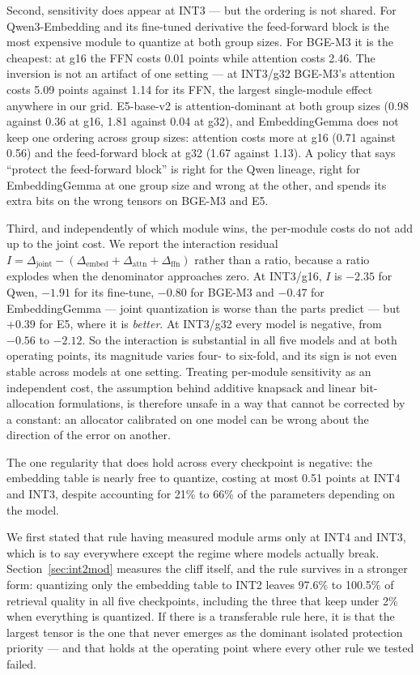 \documentclass[11pt]{article}
\begin{document}
Second, sensitivity does appear at INT3 --- but the ordering is not shared. For
Qwen3-Embedding and its fine-tuned derivative the feed-forward block is the most expensive
module to quantize at both group sizes. For BGE-M3 it is the cheapest: at g16 the FFN costs
0.01 points while attention costs 2.46. The inversion is not an artifact of one setting --- at
INT3/g32 BGE-M3's attention costs 5.09 points against 1.14 for its FFN, the largest
single-module effect anywhere in our grid. E5-base-v2 is attention-dominant at both group
sizes (0.98 against 0.36 at g16, 1.81 against 0.04 at g32), and EmbeddingGemma does not keep
one ordering across group sizes: attention costs more at g16 (0.71 against 0.56) and the
feed-forward block at g32 (1.67 against 1.13). A policy that says ``protect the feed-forward
block'' is right for the Qwen lineage, right for EmbeddingGemma at one group size and wrong at
the other, and spends its extra bits on the wrong tensors on BGE-M3 and E5.

Third, and independently of which module wins, the per-module costs do not add up to the
joint cost. We report the interaction residual $I = \Delta_{\text{joint}} -
(\Delta_{\text{embed}} + \Delta_{\text{attn}} + \Delta_{\text{ffn}})$ rather than a ratio,
because a ratio explodes when the denominator approaches zero. At INT3/g16, $I$ is $-2.35$ for Qwen,
$-1.91$ for its fine-tune, $-0.80$ for BGE-M3 and $-0.47$ for EmbeddingGemma --- joint
quantization is worse than the parts predict --- but $+0.39$ for E5, where it is
\emph{better}. At INT3/g32 every model is negative, from $-0.56$ to $-2.12$. So the
interaction is substantial in all five models and at both operating points, its magnitude
varies four- to six-fold, and its sign is not even stable across models at one setting. Treating
per-module sensitivity as an independent cost, the assumption behind additive knapsack and
linear bit-allocation formulations, is therefore unsafe in a way that cannot be corrected by a
constant: an allocator calibrated on one model can be wrong about the direction of the error
on another.

The one regularity that does hold across every checkpoint is negative: the embedding
table is nearly free to quantize, costing at most 0.51 points at INT4 and INT3, despite
accounting for 21\% to 66\% of the parameters depending on the model.

We first stated that rule having measured module arms only at INT4 and INT3, which is to
say everywhere except the regime where models actually break. Section~\ref{sec:int2mod}
measures the cliff itself, and the rule survives in a stronger form: quantizing only the
embedding table to INT2 leaves 97.6\% to 100.5\% of retrieval quality in all five
checkpoints, including the three that keep under 2\% when everything is quantized. If there
is a transferable rule here, it is that the largest tensor is the one that never emerges as the
dominant isolated protection priority --- and that holds at the operating point where every
other rule we tested failed.
\end{document}
